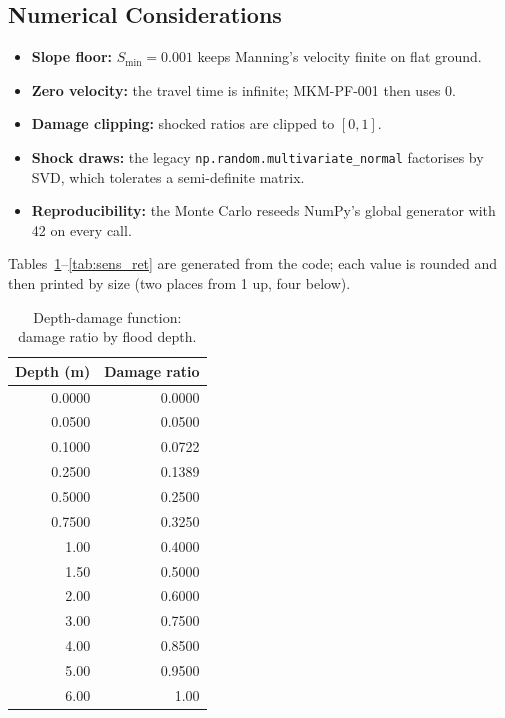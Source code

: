 \documentclass[11pt,a4paper]{article}
\begin{document}
\subsection{Numerical Considerations}
\begin{itemize}[nosep]
    \item \textbf{Slope floor:} $S_{\min}=0.001$ keeps Manning's velocity finite on flat ground.
    \item \textbf{Zero velocity:} the travel time is infinite; MKM-PF-001 then uses 0.
    \item \textbf{Damage clipping:} shocked ratios are clipped to $[0,1]$.
    \item \textbf{Shock draws:} the legacy \texttt{np.random.multivariate\_normal} factorises
          by SVD, which tolerates a semi-definite matrix.
    \item \textbf{Reproducibility:} the Monte Carlo reseeds NumPy's global generator with
          42 on every call.
\end{itemize}

\mkmsensitivity

Tables~\ref{tab:sens_dd}--\ref{tab:sens_ret} are generated from the code; each value is
rounded and then printed by size (two places from 1 up, four below).

\begin{table}[H]
    \centering
    \caption{Depth-damage function: damage ratio by flood depth.}
    \label{tab:sens_dd}
    \begin{tabular}{rr}
        \toprule
        \textbf{Depth (m)} & \textbf{Damage ratio} \\
        \midrule
        0.0000 & 0.0000 \\ 0.0500 & 0.0500 \\ 0.1000 & 0.0722 \\ 0.2500 & 0.1389 \\
        0.5000 & 0.2500 \\ 0.7500 & 0.3250 \\ 1.00 & 0.4000 \\ 1.50 & 0.5000 \\
        2.00 & 0.6000 \\ 3.00 & 0.7500 \\ 4.00 & 0.8500 \\ 5.00 & 0.9500 \\ 6.00 & 1.00 \\
        \bottomrule
    \end{tabular}
\end{table}
\end{document}
